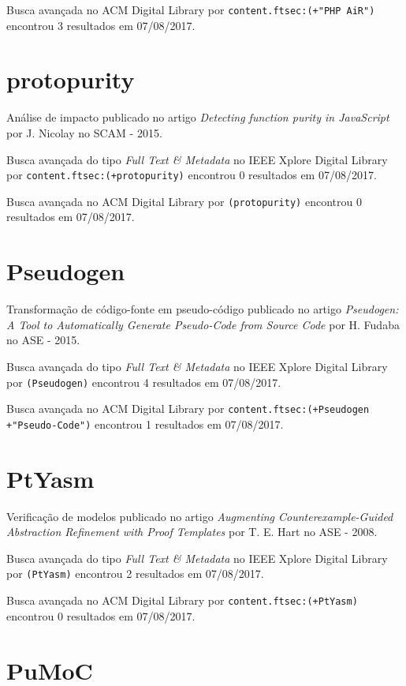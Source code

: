 Busca avançada no ACM Digital Library por
\texttt{content.ftsec:(+"PHP AiR")}
encontrou
3 resultados em
07/08/2017.

\section{protopurity}

Análise de impacto
publicado no artigo
{\it Detecting function purity in JavaScript}
por
J. Nicolay
no
SCAM
-
2015.

Busca avançada do tipo {\it Full Text \& Metadata} no IEEE Xplore Digital Library por
\texttt{content.ftsec:(+protopurity)}
encontrou
0 resultados em
07/08/2017.

Busca avançada no ACM Digital Library por
\texttt{(protopurity)}
encontrou
0 resultados em
07/08/2017.

\section{Pseudogen}

Transformação de código-fonte em pseudo-código
publicado no artigo
{\it Pseudogen: A Tool to Automatically Generate Pseudo-Code from Source Code}
por
H. Fudaba
no
ASE
-
2015.

Busca avançada do tipo {\it Full Text \& Metadata} no IEEE Xplore Digital Library por
\texttt{(Pseudogen)}
encontrou
4 resultados em
07/08/2017.

Busca avançada no ACM Digital Library por
\texttt{content.ftsec:(+Pseudogen +"Pseudo-Code")}
encontrou
1 resultados em
07/08/2017.

\section{PtYasm}

Verificação de modelos
publicado no artigo
{\it Augmenting Counterexample-Guided Abstraction Refinement with Proof Templates}
por
T. E. Hart
no
ASE
-
2008.

Busca avançada do tipo {\it Full Text \& Metadata} no IEEE Xplore Digital Library por
\texttt{(PtYasm)}
encontrou
2 resultados em
07/08/2017.

Busca avançada no ACM Digital Library por
\texttt{content.ftsec:(+PtYasm)}
encontrou
0 resultados em
07/08/2017.

\section{PuMoC}

